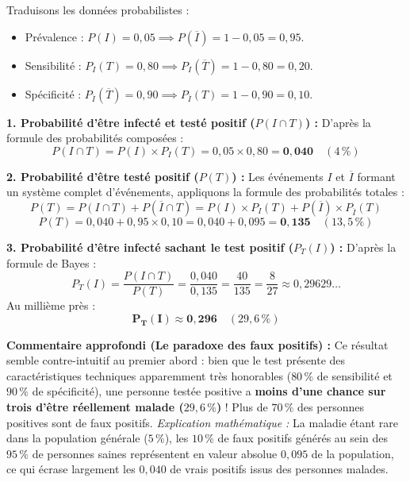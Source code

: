 \documentclass[11pt,a4paper]{article}
\begin{document}
\begin{correctionbox}
Traduisons les données probabilistes :
\begin{itemize}[label=$\bullet$]
    \item Prévalence : $P(I) = 0{,}05 \implies P(\overline{I}) = 1 - 0{,}05 = 0{,}95$.
    \item Sensibilité : $P_I(T) = 0{,}80 \implies P_I(\overline{T}) = 1 - 0{,}80 = 0{,}20$.
    \item Spécificité : $P_{\overline{I}}(\overline{T}) = 0{,}90 \implies P_{\overline{I}}(T) = 1 - 0{,}90 = 0{,}10$.
\end{itemize}

\textbf{1. Probabilité d'être infecté et testé positif ($P(I \cap T)$) :}
D'après la formule des probabilités composées :
\[
P(I \cap T) = P(I) \times P_I(T) = 0{,}05 \times 0{,}80 = \mathbf{0{,}040} \quad (4\,\%)
\]

\textbf{2. Probabilité d'être testé positif ($P(T)$) :}
Les événements $I$ et $\overline{I}$ formant un système complet d'événements, appliquons la formule des probabilités totales :
\[
P(T) = P(I \cap T) + P(\overline{I} \cap T) = P(I) \times P_I(T) + P(\overline{I}) \times P_{\overline{I}}(T)
\]
\[
P(T) = 0{,}040 + 0{,}95 \times 0{,}10 = 0{,}040 + 0{,}095 = \mathbf{0{,}135} \quad (13{,}5\,\%)
\]

\textbf{3. Probabilité d'être infecté sachant le test positif ($P_T(I)$) :}
D'après la formule de Bayes :
\[
P_T(I) = \frac{P(I \cap T)}{P(T)} = \frac{0{,}040}{0{,}135} = \frac{40}{135} = \frac{8}{27} \approx 0{,}29629\dots
\]
Au millième près :
\[
\mathbf{P_T(I) \approx 0{,}296} \quad (29{,}6\,\%)
\]

\textbf{Commentaire approfondi (Le paradoxe des faux positifs) :}
Ce résultat semble contre-intuitif au premier abord : bien que le test présente des caractéristiques techniques apparemment très honorables ($80\,\%$ de sensibilité et $90\,\%$ de spécificité), une personne testée positive a \textbf{moins d'une chance sur trois d'être réellement malade ($29{,}6\,\%$)} ! Plus de $70\,\%$ des personnes positives sont de faux positifs.
\emph{Explication mathématique :} La maladie étant rare dans la population générale ($5\,\%$), les $10\,\%$ de faux positifs générés au sein des $95\,\%$ de personnes saines représentent en valeur absolue $0{,}095$ de la population, ce qui écrase largement les $0{,}040$ de vrais positifs issus des personnes malades.
\end{correctionbox}
\end{document}
